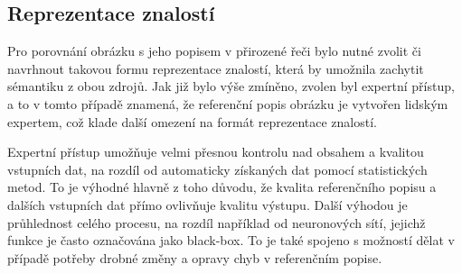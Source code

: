 \subsection{Reprezentace znalostí}\label{subsec:reprezentace_znalosti}
Pro porovnání obrázku s jeho popisem v přirozené řeči bylo nutné zvolit či navrhnout takovou formu reprezentace znalostí,
která by umožnila zachytit sémantiku z obou zdrojů.
Jak již bylo výše zmíněno, zvolen byl expertní přístup, a to v tomto případě znamená, že referenční popis obrázku je vytvořen lidským expertem,
což klade další omezení na formát reprezentace znalostí.

Expertní přístup umožňuje velmi přesnou kontrolu nad obsahem a kvalitou vstupních dat, na rozdíl od automaticky získaných dat pomocí statistických metod.
To je výhodné hlavně z toho důvodu, že kvalita referenčního popisu a dalších vstupních dat přímo ovlivňuje kvalitu výstupu.
Další výhodou je průhlednost celého procesu, na rozdíl například od neuronových sítí, jejichž funkce je často označována jako black-box.
To je také spojeno s možností dělat v případě potřeby drobné změny a opravy chyb v referenčním popise.

